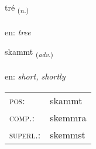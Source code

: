 \documentclass[frontgrid, backgrid]{flacards}\usepackage[]{graphicx}\usepackage[]{color}
\begin{document}
\renewcommand{\flhead}{\vskip5pt \fboxsep=0pt {\small\bfseries\footnotesize Nafnorð | Noun}}
\renewcommand{\fcfoot}{\vskip5pt \fboxsep=0pt \hspace{2pt}{\small\bfseries\footnotesize 2K}}

\renewcommand{\blhead}{\vskip5pt {\small\bfseries\footnotesize Nafnorð | Noun }}
\renewcommand{\bcfoot}{\vskip5pt \hspace{2pt}{\small\bfseries\footnotesize 2K}}


{tré \small{\textsubscript{(\textit{n.})}} \\[1ex] %
\textphonetic{[tʰrjɛː]} \\
en: \emph{tree} \\  [2ex]
\renewcommand*{\arraystretch}{0.8}
}

\renewcommand{\flhead}{\vskip5pt \fboxsep=0pt {\small\bfseries\footnotesize Atviksorð | Adverb}}
\renewcommand{\fcfoot}{\vskip5pt \fboxsep=0pt \hspace{2pt}{\small\bfseries\footnotesize 2K}}

\renewcommand{\blhead}{\vskip5pt {\small\bfseries\footnotesize Atviksorð | Adverb }}
\renewcommand{\bcfoot}{\vskip5pt \hspace{2pt}{\small\bfseries\footnotesize 2K}}


{skammt \small{\textsubscript{(\textit{adv.})}} \\[1ex] %
\textphonetic{[skam̥t]} \\
en: \emph{short, shortly} \\  [2ex]
\renewcommand*{\arraystretch}{0.8}
\begin{tabular}{ll}
\textsc{pos}: & skammt \\ 
\textsc{comp.}: & skemmra \\ 
\textsc{superl.}: & skemmst \\
\end{tabular}
}
\end{document}
